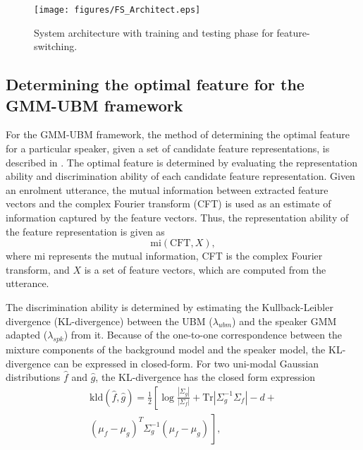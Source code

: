 \documentclass{article}
\begin{document}
\begin{figure}[th]
\centering
\texttt{[image: figures/FS\_Architect.eps]}
\caption{System architecture with training and testing phase for feature-switching.}
\label{fig:systemArch}
\end{figure}



\subsection{Determining the optimal feature for the GMM-UBM framework}
\label{subsec:ubm_optFeat}

For the GMM-UBM framework, the method of determining the optimal feature for a
particular speaker, given a set of candidate feature representations, is
described in \cite{padmanInterspeech2010}. The optimal feature is determined by
evaluating the representation ability and discrimination ability
of each candidate feature representation. Given an enrolment utterance, the
mutual information between extracted feature vectors and the complex Fourier
transform (CFT) is used as an estimate of information captured by the feature
vectors. Thus, the representation ability of the feature representation is given
as 
\begin{equation}
\textrm{mi}(\textrm{CFT},X),
\end{equation}
where $\textrm{mi}$ represents the mutual information, CFT is the complex
Fourier transform, and $X$ is a set of feature vectors, which are computed from
the utterance.


The discrimination ability is determined by estimating the Kullback-Leibler divergence
(KL-divergence) between the UBM ($\lambda_{ubm}$) and the speaker GMM adapted 
($\lambda_{spk}$) from it. Because of the one-to-one
correspondence between the mixture components of the background model and the speaker model, 
the KL-divergence can be expressed in closed-form. For two uni-modal Gaussian distributions
$\hat{f}$ and $\hat{g}$, the KL-divergence has the closed form expression
\begin{equation}
\begin{split}
\textrm{kld}(\hat{f},\hat{g}) = \frac{1}{2}\left[ \log \frac{|\Sigma_g|}{|\Sigma_f|} +
	\textrm{Tr}|\Sigma^{-1}_g\Sigma_f| - d + \right. \\ 
\left. (\mu_f-\mu_g)^T\Sigma_g^{-1}(\mu_f-\mu_g) \frac{}{} \right], 
\end{split}
\label{eq:kldGaussians}
\end{equation}
\end{document}
